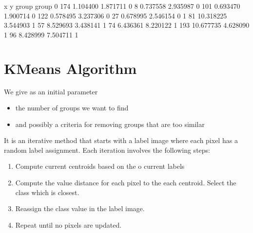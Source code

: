 \documentclass[letterpaper,10pt,english]{sphinxmanual}
\begin{document}
\begin{sphinxVerbatim}[commandchars=\\\{\}]
                   x         y  group
group                                
0     174  \PYGZhy{}1.104400  1.871711      0
      8    \PYGZhy{}0.737558  2.935987      0
      101  \PYGZhy{}0.693470  1.900714      0
      122  \PYGZhy{}0.578495  3.237306      0
      27   \PYGZhy{}0.678995  2.546154      0
1     81   10.318225 \PYGZhy{}3.544903      1
      57    8.529693 \PYGZhy{}3.438141      1
      74    6.436361 \PYGZhy{}8.220122      1
      193  10.677735 \PYGZhy{}4.628090      1
      96    8.428999 \PYGZhy{}7.504711      1
\end{sphinxVerbatim}

\noindent{}


\section{K\sphinxhyphen{}Means Algorithm}
\label{\detokenize{05-AdvancedSegmentation:k-means-algorithm}}
\sphinxAtStartPar
We give as an initial parameter
\begin{itemize}
\item {} 
\sphinxAtStartPar
the number of groups we want to find

\item {} 
\sphinxAtStartPar
and possibly a criteria for removing groups that are too similar

\end{itemize}



\sphinxAtStartPar
It is an iterative method that starts with a label image where each pixel has a random label assignment. Each iteration involves the following steps:
\begin{enumerate}
%
\item {} 
\sphinxAtStartPar
Compute current centroids based on the o current labels

\item {} 
\sphinxAtStartPar
Compute the value distance for each pixel to the each centroid. Select the class which is closest.

\item {} 
\sphinxAtStartPar
Reassign the class value in the label image.

\item {} 
\sphinxAtStartPar
Repeat until no pixels are updated.

\end{enumerate}
\end{document}
